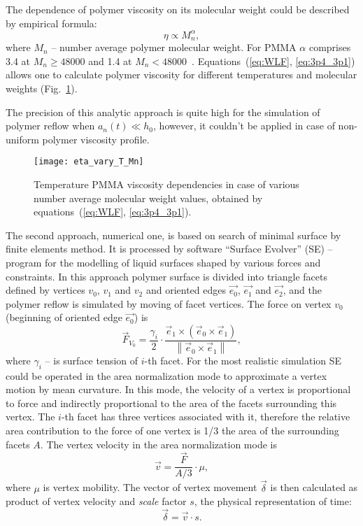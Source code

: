 \documentclass[12pt]{iopart}
\begin{document}
The dependence of polymer viscosity on its molecular weight could be described by empirical formula:
\begin{equation} \label{eq:3p4_3p1}
	\eta \propto M_n^\alpha,
\end{equation}
where $M_n$ -- number average polymer molecular weight. For PMMA $\alpha$ comprises 3.4 at $M_n \geq 48 000$ and 1.4 at $M_n < 48 000$~\cite{Leveder_2010, Bueche_3p4_1p4}. Equations~(\ref{eq:WLF}, \ref{eq:3p4_3p1}) allows one to calculate polymer viscosity for different temperatures and molecular weights (Fig.~\ref{fig:eta_vary_T_Mn}).

The precision of this analytic approach is quite high for the simulation of polymer reflow when $a_n(t) \ll h_0$, however, it couldn't be applied in case of non-uniform polymer viscosity profile.


\begin{figure}[h]
	\begin{center}
		\texttt{[image: eta\_vary\_T\_Mn]}
	\end{center}
	\vspace{-2em}
	\caption{Temperature PMMA viscosity dependencies in case of various number average molecular weight values, obtained by equations~(\ref{eq:WLF}, \ref{eq:3p4_3p1}).}
	\label{fig:eta_vary_T_Mn}
\end{figure}


The second approach, numerical one, is based on search of minimal surface by finite elements method. It is processed by software ``Surface Evolver'' (SE) -- program for the modelling of liquid surfaces shaped by various forces and constraints. In this approach polymer surface is divided into triangle facets defined by vertices $v_0$, $v_1$ and $v_2$ and oriented edges $\vec{e_0}$, $\vec{e_1}$ and $\vec{e_2}$, and the polymer reflow is simulated by moving of facet vertices. The force on vertex $v_0$ (beginning of oriented edge $\vec{e_0}$) is
\begin{equation}
	\vec{F}_{V_0}=\frac{\gamma_i}{2} \cdot \frac{\vec{e}_1 \times\left(\vec{e}_0 \times \vec{e}_1\right)}{\left\|\vec{e}_0 \times \vec{e}_1\right\|},
\end{equation}
where $\gamma_i$ -- is surface tension of $i$-th facet. For the most realistic simulation SE could be operated in the area normalization mode to approximate a vertex motion by mean curvature. In this mode, the velocity of a vertex is proportional to force and indirectly proportional to the area of the facets surrounding this vertex. The $i$-th facet has three vertices associated with it, therefore the relative area contribution to the force of one vertex is 1/3 the area of the surrounding facets $A$. The vertex velocity in the area normalization mode is
\begin{equation}
	\vec{v} = \frac{\vec{F}}{A/3} \cdot \mu,
\end{equation}
where $\mu$ is vertex mobility. The vector of vertex movement $\vec{\delta}$ is then calculated as product of vertex velocity and \textit{scale} factor $s$, the physical representation of time:
\begin{equation} \label{eq:SE_delta}
	\vec{\delta} = \vec{v} \cdot s.
\end{equation}
\end{document}
